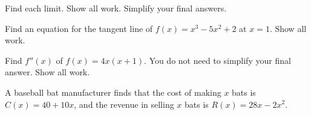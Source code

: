 \documentclass[addpoints,12pt]{exam}
\newcommand{\ds}{\displaystyle}
\begin{document}
\begin{questions}

\newpage


\question Find each limit. Show all work. Simplify your final answers.


\newpage

\question[11] Find an equation for the tangent line of $f(x)=x^3-5x^2+2$ at $x=1$. Show all
work.

\newpage

\question[8] Find $f''(x)$ of $f(x)=4x(x+1)$. You do not need to simplify your final answer. Show
all work.


\newpage




\question A baseball bat manufacturer finds that the cost of making $x$ bats is $C(x)=40+10x$,
and the revenue in selling $x$ bats is $R(x)=28x-2x^2$.

\end{questions}
\end{document}

